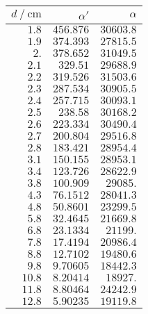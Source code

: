 \begin{tabular}{rrr}
	\toprule
	$d ~/~ \si{\centi\meter}$ & $\alpha'$ & $\alpha$\\
	\midrule
	$\num{1.8}$ & $\num{456.876}$ & $\num{30603.8}$ \\
	$\num{1.9}$ & $\num{374.393}$ & $\num{27815.5}$ \\
	$\num{2.}$ & $\num{378.652}$ & $\num{31049.5}$ \\
	$\num{2.1}$ & $\num{329.51}$ & $\num{29688.9}$ \\
	$\num{2.2}$ & $\num{319.526}$ & $\num{31503.6}$ \\
	$\num{2.3}$ & $\num{287.534}$ & $\num{30905.5}$ \\
	$\num{2.4}$ & $\num{257.715}$ & $\num{30093.1}$ \\
	$\num{2.5}$ & $\num{238.58}$ & $\num{30168.2}$ \\
	$\num{2.6}$ & $\num{223.334}$ & $\num{30490.4}$ \\
	$\num{2.7}$ & $\num{200.804}$ & $\num{29516.8}$ \\
	$\num{2.8}$ & $\num{183.421}$ & $\num{28954.4}$ \\
	$\num{3.1}$ & $\num{150.155}$ & $\num{28953.1}$ \\
	$\num{3.4}$ & $\num{123.726}$ & $\num{28622.9}$ \\
	$\num{3.8}$ & $\num{100.909}$ & $\num{29085.}$ \\
	$\num{4.3}$ & $\num{76.1512}$ & $\num{28041.3}$ \\
	$\num{4.8}$ & $\num{50.8601}$ & $\num{23299.5}$ \\
	$\num{5.8}$ & $\num{32.4645}$ & $\num{21669.8}$ \\
	$\num{6.8}$ & $\num{23.1334}$ & $\num{21199.}$ \\
	$\num{7.8}$ & $\num{17.4194}$ & $\num{20986.4}$ \\
	$\num{8.8}$ & $\num{12.7102}$ & $\num{19480.6}$ \\
	$\num{9.8}$ & $\num{9.70605}$ & $\num{18442.3}$ \\
	$\num{10.8}$ & $\num{8.20414}$ & $\num{18927.}$ \\
	$\num{11.8}$ & $\num{8.80464}$ & $\num{24242.9}$ \\
	$\num{12.8}$ & $\num{5.90235}$ & $\num{19119.8}$ \\
	\bottomrule
\end{tabular}
